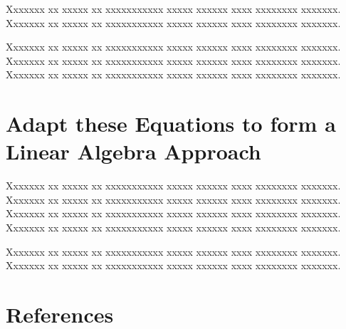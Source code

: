\documentclass{article}
\begin{document}
Xxxxxxx xx xxxxx xx xxxxxxxxxxx xxxxx xxxxxx xxxx xxxxxxxx xxxxxxx.
Xxxxxxx xx xxxxx xx xxxxxxxxxxx xxxxx xxxxxx xxxx xxxxxxxx xxxxxxx.

Xxxxxxx xx xxxxx xx xxxxxxxxxxx xxxxx xxxxxx xxxx xxxxxxxx xxxxxxx.
Xxxxxxx xx xxxxx xx xxxxxxxxxxx xxxxx xxxxxx xxxx xxxxxxxx xxxxxxx.
Xxxxxxx xx xxxxx xx xxxxxxxxxxx xxxxx xxxxxx xxxx xxxxxxxx xxxxxxx.



\section{Adapt these Equations to form a Linear Algebra Approach}

Xxxxxxx xx xxxxx xx xxxxxxxxxxx xxxxx xxxxxx xxxx xxxxxxxx xxxxxxx.
Xxxxxxx xx xxxxx xx xxxxxxxxxxx xxxxx xxxxxx xxxx xxxxxxxx xxxxxxx.
Xxxxxxx xx xxxxx xx xxxxxxxxxxx xxxxx xxxxxx xxxx xxxxxxxx xxxxxxx.
Xxxxxxx xx xxxxx xx xxxxxxxxxxx xxxxx xxxxxx xxxx xxxxxxxx xxxxxxx.

Xxxxxxx xx xxxxx xx xxxxxxxxxxx xxxxx xxxxxx xxxx xxxxxxxx xxxxxxx.
Xxxxxxx xx xxxxx xx xxxxxxxxxxx xxxxx xxxxxx xxxx xxxxxxxx xxxxxxx.



\nocite{berns:91}
\nocite{hecht:90}
\nocite{kosko:92}


\section*{References\label{sec:cites}}






\end{document}
